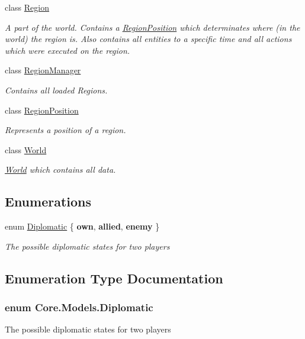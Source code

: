 \begin{DoxyCompactItemize}
class \hyperlink{classCore_1_1Models_1_1Region}{Region}
\begin{DoxyCompactList}\small\item\em A part of the world. Contains a \hyperlink{classCore_1_1Models_1_1RegionPosition}{Region\+Position} which determinates where (in the world) the region is. Also contains all entities to a specific time and all actions which were executed on the region. \end{DoxyCompactList}\item 
class \hyperlink{classCore_1_1Models_1_1RegionManager}{Region\+Manager}
\begin{DoxyCompactList}\small\item\em Contains all loaded Regions. \end{DoxyCompactList}\item 
class \hyperlink{classCore_1_1Models_1_1RegionPosition}{Region\+Position}
\begin{DoxyCompactList}\small\item\em Represents a position of a region. \end{DoxyCompactList}\item 
class \hyperlink{classCore_1_1Models_1_1World}{World}
\begin{DoxyCompactList}\small\item\em \hyperlink{classCore_1_1Models_1_1World}{World} which contains all data. \end{DoxyCompactList}\end{DoxyCompactItemize}
\subsection*{Enumerations}
\begin{DoxyCompactItemize}
\item 
enum \hyperlink{namespaceCore_1_1Models_ada607f76afbafc59695c90fc5a7093a2}{Diplomatic} \{ {\bfseries own}, 
{\bfseries allied}, 
{\bfseries enemy}
 \}\begin{DoxyCompactList}\small\item\em The possible diplomatic states for two players \end{DoxyCompactList}
\end{DoxyCompactItemize}


\subsection{Enumeration Type Documentation}
\hypertarget{namespaceCore_1_1Models_ada607f76afbafc59695c90fc5a7093a2}{}
\subsubsection[{Diplomatic}]{\setlength{\rightskip}{0pt plus 5cm}enum {\bf Core.\+Models.\+Diplomatic}\hspace{0.3cm}{\ttfamily [strong]}}\label{namespaceCore_1_1Models_ada607f76afbafc59695c90fc5a7093a2}


The possible diplomatic states for two players 

